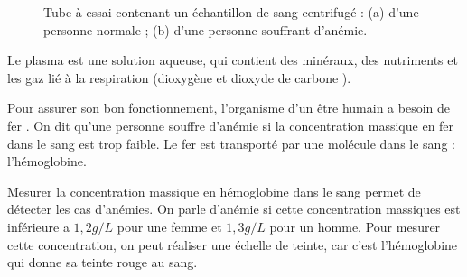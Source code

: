 \begin{figure}[!ht]
  \centering
  \begin{subfigure}{0.48\linewidth}
    \label{fig:sang_normal}
  \end{subfigure}
  \begin{subfigure}{0.48\linewidth}
    \label{fig:sang_anemie}
  \end{subfigure}
  \caption{
    \centering
    Tube à essai contenant un échantillon de sang centrifugé : (a) d'une personne normale ; (b) d'une personne souffrant d'anémie.
  }
  \label{fig:sang}
\end{figure}

%


Le plasma est une solution aqueuse, qui contient des minéraux, des nutriments et les gaz lié à la respiration (dioxygène  et dioxyde de carbone ).

%


Pour assurer son bon fonctionnement, l'organisme d'un être humain a besoin de fer .
On dit qu'une personne souffre d'anémie si la concentration massique en fer dans le sang est trop faible.
Le fer est transporté par une molécule dans le sang : l'hémoglobine.

%


Mesurer la concentration massique en hémoglobine dans le sang permet de détecter les cas d'anémies.
On parle d'anémie si cette concentration massiques est inférieure a $1,\!2 \unit{g/L}$ pour une femme et $1,\!3 \unit{g/L}$ pour un homme.
Pour mesurer cette concentration, on peut réaliser une échelle de teinte, car c'est l'hémoglobine qui donne sa teinte rouge au sang.

